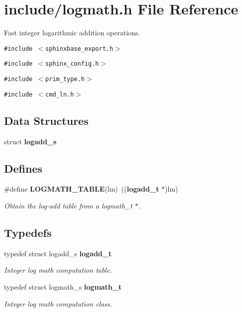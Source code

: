 \section{include/logmath.h File Reference}
\label{logmath_8h}
Fast integer logarithmic addition operations.  


{\tt \#include $<$sphinxbase\_\-export.h$>$}\par
{\tt \#include $<$sphinx\_\-config.h$>$}\par
{\tt \#include $<$prim\_\-type.h$>$}\par
{\tt \#include $<$cmd\_\-ln.h$>$}\par
\subsection*{Data Structures}
\begin{CompactItemize}
\item 
struct \textbf{logadd\_\-s}
\end{CompactItemize}
\subsection*{Defines}
\begin{CompactItemize}
\item 
\#define {\bf LOGMATH\_\-TABLE}(lm)~(({\bf logadd\_\-t} $\ast$)lm)\label{logmath_8h_e5c5ce106e9f8f1e763d419de53317a8}

\begin{CompactList}\small\item\em Obtain the log-add table from a logmath\_\-t $\ast$. \item\end{CompactList}\end{CompactItemize}
\subsection*{Typedefs}
\begin{CompactItemize}
\item 
typedef struct logadd\_\-s {\bf logadd\_\-t}
\begin{CompactList}\small\item\em Integer log math computation table. \item\end{CompactList}\item 
typedef struct logmath\_\-s {\bf logmath\_\-t}\label{logmath_8h_e613aa7db1dd40ff56a80a7dadb22cc8}

\begin{CompactList}\small\item\em Integer log math computation class. \item\end{CompactList}\end{CompactItemize}

